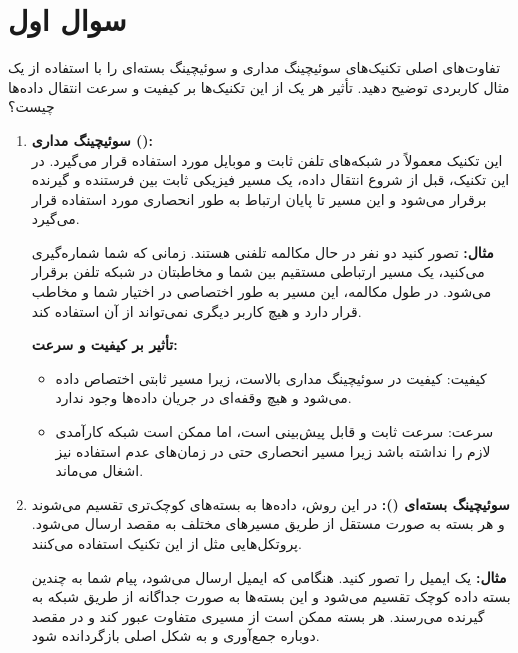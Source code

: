 \section{سوال اول}
تفاوت‌های اصلی تکنیک‌های سوئیچینگ مداری و سوئیچینگ بسته‌ای را با استفاده از یک مثال کاربردی توضیح دهید. تأثیر هر یک از این تکنیک‌ها بر کیفیت و سرعت انتقال داده‌ها چیست؟



\begin{qsolve}
	\begin{enumerate}
		\item 
		\textbf{سوئیچینگ مداری ():}\\
		این تکنیک معمولاً در شبکه‌های تلفن ثابت و موبایل مورد استفاده قرار می‌گیرد. در این تکنیک، قبل از شروع انتقال داده، یک مسیر فیزیکی ثابت بین فرستنده و گیرنده برقرار می‌شود و این مسیر تا پایان ارتباط به طور انحصاری مورد استفاده قرار می‌گیرد.
		
		\textbf{مثال:}
		تصور کنید دو نفر در حال مکالمه تلفنی هستند. زمانی که شما شماره‌گیری می‌کنید، یک مسیر ارتباطی مستقیم بین شما و مخاطبتان در شبکه تلفن برقرار می‌شود. در طول مکالمه، این مسیر به طور اختصاصی در اختیار شما و مخاطب قرار دارد و هیچ کاربر دیگری نمی‌تواند از آن استفاده کند.
		
		\textbf{تأثیر بر کیفیت و سرعت:}
		\begin{itemize}
			\item 
			کیفیت: کیفیت در سوئیچینگ مداری بالاست، زیرا مسیر ثابتی اختصاص داده می‌شود و هیچ وقفه‌ای در جریان داده‌ها وجود ندارد.
			
			\item 
			سرعت: سرعت ثابت و قابل پیش‌بینی است، اما ممکن است شبکه کارآمدی لازم را نداشته باشد زیرا مسیر انحصاری حتی در زمان‌های عدم استفاده نیز اشغال می‌ماند.
		\end{itemize}
		
		
		
		
		\item 
		\textbf{سوئیچینگ بسته‌ای ():}
		در این روش، داده‌ها به بسته‌های کوچک‌تری تقسیم می‌شوند و هر بسته به صورت مستقل از طریق مسیرهای مختلف به مقصد ارسال می‌شود. پروتکل‌هایی مثل  از این تکنیک استفاده می‌کنند.
		
		\textbf{مثال:}
		یک ایمیل را تصور کنید. هنگامی که ایمیل ارسال می‌شود، پیام شما به چندین بسته داده کوچک تقسیم می‌شود و این بسته‌ها به صورت جداگانه از طریق شبکه به گیرنده می‌رسند. هر بسته ممکن است از مسیری متفاوت عبور کند و در مقصد دوباره جمع‌آوری و به شکل اصلی بازگردانده شود.
		

\end{enumerate}
\end{qsolve}
